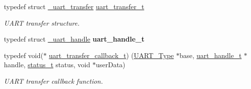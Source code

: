 \begin{DoxyCompactItemize}
\mbox{\label{group__uart__driver_gae245db88e02822f416e4d246d49076df}} 
typedef struct \mbox{\hyperlink{struct__uart__transfer}{\+\_\+uart\+\_\+transfer}} \mbox{\hyperlink{group__uart__driver_gae245db88e02822f416e4d246d49076df}{uart\+\_\+transfer\+\_\+t}}
\begin{DoxyCompactList}\small\item\em U\+A\+RT transfer structure. \end{DoxyCompactList}\item 
\mbox{\label{group__uart__driver_gae4cc0b0d1b32237a516424ff2f60e406}} 
typedef struct \mbox{\hyperlink{struct__uart__handle}{\+\_\+uart\+\_\+handle}} {\bfseries uart\+\_\+handle\+\_\+t}
\item 
\mbox{\label{group__uart__driver_ga2868b6ea396ab212547f2157380429c5}} 
typedef void($\ast$ \mbox{\hyperlink{group__uart__driver_ga2868b6ea396ab212547f2157380429c5}{uart\+\_\+transfer\+\_\+callback\+\_\+t}}) (\mbox{\hyperlink{struct_u_a_r_t___type}{U\+A\+R\+T\+\_\+\+Type}} $\ast$base, \mbox{\hyperlink{struct__uart__handle}{uart\+\_\+handle\+\_\+t}} $\ast$handle, \mbox{\hyperlink{group__ksdk__common_gaaabdaf7ee58ca7269bd4bf24efcde092}{status\+\_\+t}} status, void $\ast$user\+Data)
\begin{DoxyCompactList}\small\item\em U\+A\+RT transfer callback function. \end{DoxyCompactList}\end{DoxyCompactItemize}
